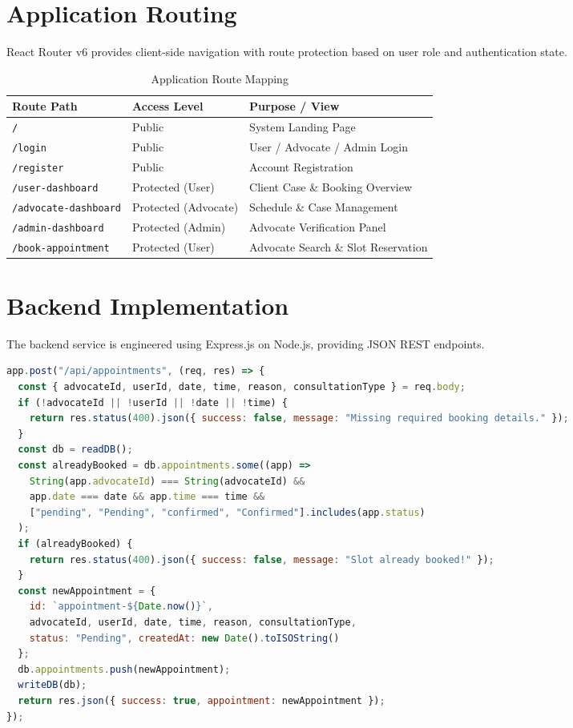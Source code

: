 \documentclass[12pt,a4paper]{report}
\begin{document}
\section{Application Routing}
React Router v6 provides client-side navigation with route protection based on user role and authentication state.

\begin{table}[h!]
    \centering
    \caption{Application Route Mapping}
    \label{tab:routes}
    \begin{tabular}{p{4.5cm} p{4.5cm} p{5cm}}
        \toprule
        \textbf{Route Path} & \textbf{Access Level} & \textbf{Purpose / View} \\
        \midrule
        \texttt{/} & Public & System Landing Page \\
        \texttt{/login} & Public & User / Advocate / Admin Login \\
        \texttt{/register} & Public & Account Registration \\
        \texttt{/user-dashboard} & Protected (User) & Client Case \& Booking Overview \\
        \texttt{/advocate-dashboard} & Protected (Advocate) & Schedule \& Case Management \\
        \texttt{/admin-dashboard} & Protected (Admin) & Advocate Verification Panel \\
        \texttt{/book-appointment} & Protected (User) & Advocate Search \& Slot Reservation \\
        \bottomrule
    \end{tabular}
\end{table}

\section{Backend Implementation}
The backend service is engineered using Express.js on Node.js, providing JSON REST endpoints.

\begin{lstlisting}[language=JavaScript, caption={Core Appointment Booking Endpoint Handler in Express.js}]
app.post("/api/appointments", (req, res) => {
  const { advocateId, userId, date, time, reason, consultationType } = req.body;
  if (!advocateId || !userId || !date || !time) {
    return res.status(400).json({ success: false, message: "Missing required booking details." });
  }
  const db = readDB();
  const alreadyBooked = db.appointments.some((app) => 
    String(app.advocateId) === String(advocateId) &&
    app.date === date && app.time === time &&
    ["pending", "Pending", "confirmed", "Confirmed"].includes(app.status)
  );
  if (alreadyBooked) {
    return res.status(400).json({ success: false, message: "Slot already booked!" });
  }
  const newAppointment = {
    id: `appointment-${Date.now()}`,
    advocateId, userId, date, time, reason, consultationType,
    status: "Pending", createdAt: new Date().toISOString()
  };
  db.appointments.push(newAppointment);
  writeDB(db);
  return res.json({ success: true, appointment: newAppointment });
});
\end{lstlisting}
\end{document}
